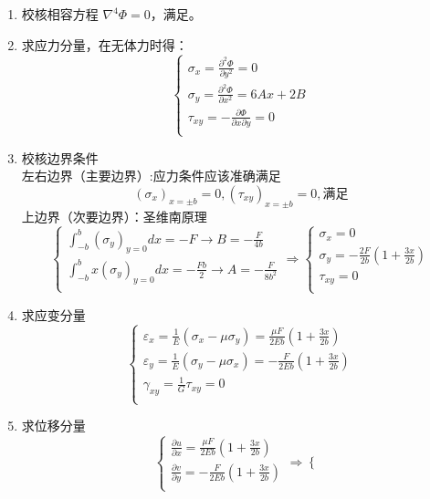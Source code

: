 \begin{remark}
	\quad
	\begin{enumerate}
		\item 校核相容方程 $\nabla ^4\varPhi =0$，满足。
		\item 求应力分量，在无体力时得：\[\begin{cases}
		\sigma _x=\frac{\partial ^2\varPhi}{\partial y^2}=0\\
		\sigma _y=\frac{\partial ^2\varPhi}{\partial x^2}=6Ax+2B\\
		\tau _{xy}=-\frac{\partial \varPhi}{\partial x\partial y}=0\\
		\end{cases}\]
		\item 校核边界条件\\
		左右边界（主要边界）:应力条件应该准确满足\[\left( \sigma _x \right) _{x=\pm b}=0,\left( \tau _{xy} \right) _{x=\pm b}=0,\text{满足}\]
		上边界（次要边界）：圣维南原理\[\begin{cases}
		\int_{-b}^b{\left( \sigma _y \right) _{y=0}dx}=-F\rightarrow B=-\frac{F}{4b}\\
		\int_{-b}^b{x\left( \sigma _y \right) _{y=0}dx}=-\frac{Fb}{2}\rightarrow A=-\frac{F}{8b^2}\\
		\end{cases}\Longrightarrow \begin{cases}
		\sigma _x=0\\
		\sigma _y=-\frac{2F}{2b}\left( 1+\frac{3x}{2b} \right)\\
		\tau _{xy}=0\\
		\end{cases}\]
		\item 求应变分量\[\begin{cases}
		\varepsilon _x=\frac{1}{E}\left( \sigma _x-\mu \sigma _y \right) =\frac{\mu F}{2Eb}\left( 1+\frac{3x}{2b} \right)\\
		\varepsilon _y=\frac{1}{E}\left( \sigma _y-\mu \sigma _x \right) =-\frac{F}{2Eb}\left( 1+\frac{3x}{2b} \right)\\
		\gamma _{xy}=\frac{1}{G}\tau _{xy}=0\\
		\end{cases}\]
		\item 求位移分量\[\begin{cases}
		\frac{\partial u}{\partial x}=\frac{\mu F}{2Eb}\left( 1+\frac{3x}{2b} \right)\\
		\frac{\partial v}{\partial y}=-\frac{F}{2Eb}\left( 1+\frac{3x}{2b} \right)\\
		\end{cases}\Longrightarrow \begin{cases}

\end{cases}\]
\end{enumerate}
\end{remark}
